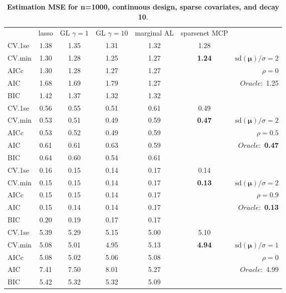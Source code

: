 \clearpage
\begin{table}\vspace{-.5cm}
\caption[l]{ { \bf Estimation MSE for n=1000, continuous design, 
sparse covariates, and  decay  10}.}
\vspace{-.5cm}
\footnotesize{}
\begin{center}
\begin{tabular}{l*{5}{c}|r}
& lasso & GL $\gamma=1$ & GL $\gamma=10$ & marginal AL & sparsenet MCP  & \\
 \cline{1-7}
CV.1se & 1.38 & 1.35 & 1.31 & 1.32 & 1.28 & \\
CV.min & 1.30 & 1.28 & 1.25 & 1.27 & {\bf 1.24} &  $\mathrm{sd}(\mathbf{\mu})/\sigma=2$ \\
AICc & 1.30 & 1.28 & 1.27 & 1.27 & & $\rho=0$ \\
AIC & 1.68 & 1.69 & 1.79 & 1.27 & &  \multirow{2}{*}{$Oracle: $ 1.25} \\
BIC & 1.42 & 1.37 & 1.32 & 1.32 & &  \\
 \hline 
CV.1se & 0.56 & 0.55 & 0.51 & 0.61 & 0.49 & \\
CV.min & 0.53 & 0.51 & 0.49 & 0.59 & {\bf 0.47} &  $\mathrm{sd}(\mathbf{\mu})/\sigma=2$ \\
AICc & 0.53 & 0.52 & 0.49 & 0.59 & & $\rho=0.5$ \\
AIC & 0.61 & 0.61 & 0.63 & 0.59 & &  \multirow{2}{*}{$Oracle: $ {\bf 0.47}} \\
BIC & 0.64 & 0.60 & 0.54 & 0.61 & &  \\
 \hline 
CV.1se & 0.16 & 0.15 & 0.14 & 0.17 & 0.14 & \\
CV.min & 0.15 & 0.15 & 0.14 & 0.17 & {\bf 0.13} &  $\mathrm{sd}(\mathbf{\mu})/\sigma=2$ \\
AICc & 0.15 & 0.15 & 0.14 & 0.17 & & $\rho=0.9$ \\
AIC & 0.15 & 0.14 & 0.14 & 0.17 & &  \multirow{2}{*}{$Oracle: $ {\bf 0.13}} \\
BIC & 0.20 & 0.19 & 0.17 & 0.17 & &  \\
 \hline 
CV.1se & 5.39 & 5.29 & 5.15 & 5.00 & 5.10 & \\
CV.min & 5.08 & 5.01 & 4.95 & 5.13 & {\bf 4.94} &  $\mathrm{sd}(\mathbf{\mu})/\sigma=1$ \\
AICc & 5.08 & 5.02 & 5.06 & 5.08 & & $\rho=0$ \\
AIC & 7.41 & 7.50 & 8.01 & 5.27 & &  \multirow{2}{*}{$Oracle: $ 4.99} \\
BIC & 5.42 & 5.32 & 5.32 & 5.09 & &  \\

\end{tabular}
\end{center}
\end{table}
